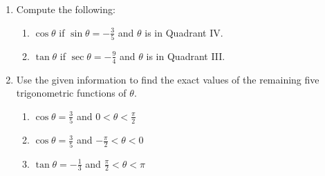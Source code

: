 \documentclass[12pt]{article}
\newif\ifans
\begin{document}
\begin{enumerate}
\begin{enumerate}
\end{enumerate}

\item Compute the following:

\begin{enumerate}

\item $\displaystyle \cos{\theta}$ if $\displaystyle \sin{\theta}=-\frac{3}{5}$ and $\theta$ is in Quadrant IV.

\ifans\fbox{$\displaystyle \cos{\theta}=\frac{4}{5}$}\fi

\item $\displaystyle \tan{\theta}$ if $\displaystyle \sec{\theta}=-\frac{9}{4}$ and $\theta$ is in Quadrant III.

\ifans\fbox{$\displaystyle \tan{\theta}=\frac{\sqrt{65}}{4}$}\fi

\end{enumerate}

\item Use the given information to find the exact values of the remaining five trigonometric functions of $\theta$.

\begin{enumerate}

\item $\displaystyle \cos{\theta}=\frac{3}{5}$ and $\displaystyle 0 < \theta < \frac{\pi}{2}$

\ifans\fbox{$\displaystyle \sin{\theta}=\frac{4}{5}$, $\displaystyle \tan{\theta}=\frac{4}{3}$, $\displaystyle \sec{\theta}=\frac{5}{3}$, $\displaystyle \csc{\theta}=\frac{5}{4}$, and $\displaystyle \cot{\theta}=\frac{3}{4}$}\fi

\item $\displaystyle \cos{\theta}=\frac{3}{5}$ and $\displaystyle -\frac{\pi}{2} < \theta < 0$

\ifans\fbox{$\displaystyle \sin{\theta}=-\frac{4}{5}$, $\displaystyle \tan{\theta}=-\frac{4}{3}$, $\displaystyle \sec{\theta}=\frac{5}{3}$, $\displaystyle \csc{\theta}=-\frac{5}{4}$, and $\displaystyle \cot{\theta}=-\frac{3}{4}$}\fi

\item $\displaystyle \tan{\theta}=-\frac{1}{3}$ and $\displaystyle \frac{\pi}{2} < \theta < \pi$

\ifans\fbox{$\displaystyle \sin{\theta}=\frac{1}{\sqrt{10}}$, $\displaystyle \cos{\theta}=-\frac{3}{\sqrt{10}}$, $\displaystyle \sec{\theta}=-\frac{\sqrt{10}}{3}$, $\displaystyle \csc{\theta}=\sqrt{10}$, and $\displaystyle \cot{\theta}=-3$}\fi


\end{enumerate}
\end{enumerate}
\end{document}
